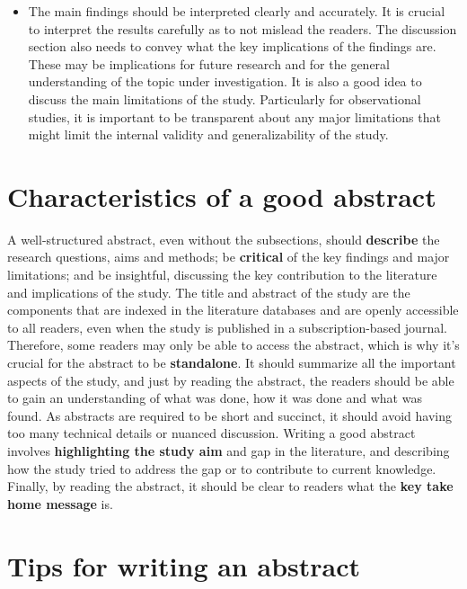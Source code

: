 \documentclass[
]{book}
\providecommand{\tightlist}{%
  \setlength{\itemsep}{0pt}\setlength{\parskip}{0pt}}
\begin{document}
\begin{itemize}
\tightlist
\item
  The main findings should be interpreted clearly and accurately. It is crucial to interpret the results carefully as to not mislead the readers. The discussion section also needs to convey what the key implications of the findings are. These may be implications for future research and for the general understanding of the topic under investigation. It is also a good idea to discuss the main limitations of the study. Particularly for observational studies, it is important to be transparent about any major limitations that might limit the internal validity and generalizability of the study.
\end{itemize}

\hypertarget{characteristics-of-a-good-abstract}{%
\section{Characteristics of a good abstract}\label{characteristics-of-a-good-abstract}}

A well-structured abstract, even without the subsections, should \textbf{describe} the research questions, aims and methods; be \textbf{critical} of the key findings and major limitations; and be insightful, discussing the key contribution to the literature and implications of the study.
The title and abstract of the study are the components that are indexed in the literature databases and are openly accessible to all readers, even when the study is published in a subscription-based journal. Therefore, some readers may only be able to access the abstract, which is why it's crucial for the abstract to be \textbf{standalone}. It should summarize all the important aspects of the study, and just by reading the abstract, the readers should be able to gain an understanding of what was done, how it was done and what was found. As abstracts are required to be short and succinct, it should avoid having too many technical details or nuanced discussion. Writing a good abstract involves \textbf{highlighting the study aim} and gap in the literature, and describing how the study tried to address the gap or to contribute to current knowledge. Finally, by reading the abstract, it should be clear to readers what the \textbf{key take home message} is.

\hypertarget{tips-for-writing-an-abstract}{%
\section{Tips for writing an abstract}\label{tips-for-writing-an-abstract}}
\end{document}
